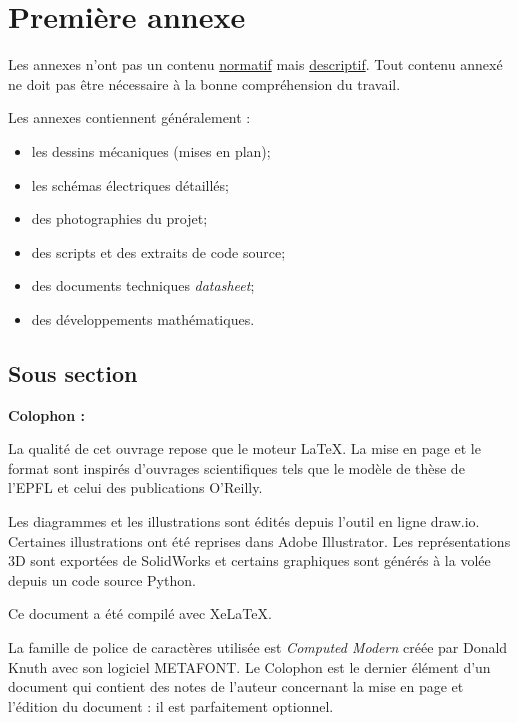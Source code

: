 \documentclass[
    iai, %
    eai, %
    confidential, %
]{heig-tb}
\begin{document}
\appendix
\appendixpage
\addappheadtotoc

\chapter{Première annexe}

Les annexes n'ont pas un contenu \underline{normatif} mais \underline{descriptif}. Tout contenu annexé ne doit pas être nécessaire à la bonne compréhension du travail.

Les annexes contiennent généralement :

\begin{itemize}
    \item les dessins mécaniques (mises en plan);
    \item les schémas électriques détaillés;
    \item des photographies du projet;
    \item des scripts et des extraits de code source;
    \item des documents techniques \pex \emph{datasheet};
    \item des développements mathématiques.
\end{itemize}

\section{Sous section}
\lipsum[1]

\let\cleardoublepage\clearpage
\backmatter

\printglossary
\printbibliography
\label{index}
\printindex

\clearpage
\Large\textbf{Colophon :}\par\normalsize
\thispagestyle{empty}
La qualité de cet ouvrage repose que le moteur \LaTeX. La mise en page et le format sont inspirés d'ouvrages scientifiques tels que le modèle de thèse de l'EPFL et celui des publications O'Reilly.

Les diagrammes et les illustrations sont édités depuis l'outil en ligne draw.io. Certaines illustrations ont été reprises dans Adobe Illustrator. Les représentations 3D sont exportées de SolidWorks et certains graphiques sont générés à la volée depuis un code source Python.

Ce document a été compilé avec XeLaTeX.

La famille de police de caractères utilisée est \emph{Computed Modern} créée par Donald Knuth avec son logiciel METAFONT.
\vfil
Le Colophon est le dernier élément d'un document qui contient des notes de l'auteur concernant la mise en page et l'édition du document : il est parfaitement optionnel.
\end{document}
